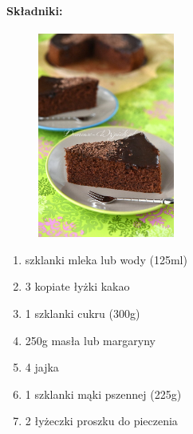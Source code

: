 \documentclass{article}
\begin{document}
    \paragraph{Składniki:}
    \begin{figure}
        \includegraphics[width=0.4\textwidth, height=0.5\textwidth]{murzynek.jpg}
    \end{figure}
    \begin{enumerate}
        \item {} szklanki mleka lub wody (125ml)
        \item 3 kopiate łyżki kakao
        \item 1 szklanki cukru (300g)
        \item 250g masła lub margaryny
        \item 4 jajka
        \item 1 szklanki mąki pszennej (225g)
        \item 2 łyżeczki proszku do pieczenia
    \end{enumerate}
\end{document}
